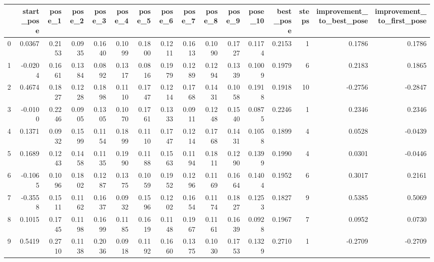 \begin{tabular}{lrrrrrrrrrrrrrrr}
\toprule
{} &  start\_pose &  pose\_1 &  pose\_2 &  pose\_3 &  pose\_4 &  pose\_5 &  pose\_6 &  pose\_7 &  pose\_8 &  pose\_9 &  pose\_10 &  best\_pose &  steps &  improvement\_to\_best\_pose &  improvement\_to\_first\_pose \\
\midrule
0 &      0.0367 &  0.2153 &  0.0935 &  0.1640 &  0.1099 &  0.1800 &  0.1211 &  0.1613 &  0.1090 &  0.1727 &   0.1174 &     0.2153 &      1 &                    0.1786 &                     0.1786 \\
1 &     -0.0204 &  0.1661 &  0.1384 &  0.0892 &  0.1317 &  0.0816 &  0.1979 &  0.1289 &  0.1294 &  0.1339 &   0.1009 &     0.1979 &      6 &                    0.2183 &                     0.1865 \\
2 &      0.4674 &  0.1827 &  0.1228 &  0.1898 &  0.1110 &  0.1747 &  0.1214 &  0.1768 &  0.1431 &  0.1058 &   0.1918 &     0.1918 &     10 &                   -0.2756 &                    -0.2847 \\
3 &     -0.0100 &  0.2246 &  0.0905 &  0.1305 &  0.1070 &  0.1761 &  0.1333 &  0.0911 &  0.1248 &  0.1540 &   0.0875 &     0.2246 &      1 &                    0.2346 &                     0.2346 \\
4 &      0.1371 &  0.0932 &  0.1599 &  0.1154 &  0.1899 &  0.1110 &  0.1747 &  0.1214 &  0.1768 &  0.1431 &   0.1058 &     0.1899 &      4 &                    0.0528 &                    -0.0439 \\
5 &      0.1689 &  0.1243 &  0.1458 &  0.1135 &  0.1990 &  0.1188 &  0.1563 &  0.1194 &  0.1811 &  0.1290 &   0.1399 &     0.1990 &      4 &                    0.0301 &                    -0.0446 \\
6 &     -0.1065 &  0.1096 &  0.1802 &  0.1287 &  0.1375 &  0.1059 &  0.1952 &  0.1296 &  0.1169 &  0.1664 &   0.1404 &     0.1952 &      6 &                    0.3017 &                     0.2161 \\
7 &     -0.3558 &  0.1511 &  0.1162 &  0.1637 &  0.0932 &  0.1596 &  0.1202 &  0.1654 &  0.1174 &  0.1827 &   0.1253 &     0.1827 &      9 &                    0.5385 &                     0.5069 \\
8 &      0.1015 &  0.1745 &  0.1198 &  0.1699 &  0.1185 &  0.1619 &  0.1148 &  0.1967 &  0.1161 &  0.1639 &   0.0928 &     0.1967 &      7 &                    0.0952 &                     0.0730 \\
9 &      0.5419 &  0.2710 &  0.1138 &  0.2036 &  0.0918 &  0.1192 &  0.1660 &  0.1375 &  0.1030 &  0.1753 &   0.1329 &     0.2710 &      1 &                   -0.2709 &                    -0.2709 \\
\bottomrule
\end{tabular}
